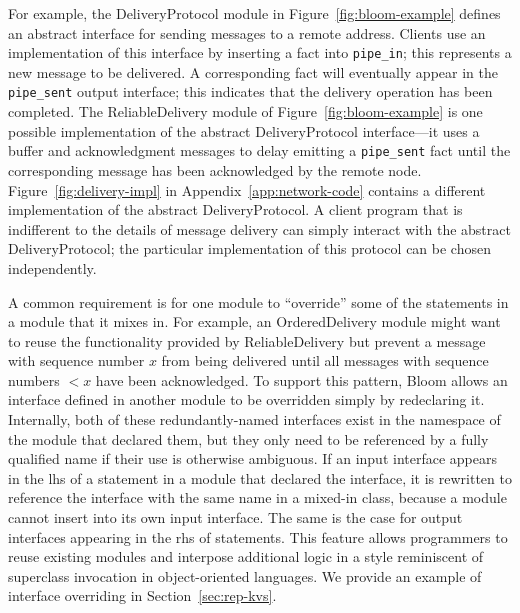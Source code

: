 For example, the DeliveryProtocol module in Figure~\ref{fig:bloom-example}
defines an abstract interface for sending messages to a remote address. Clients
use an implementation of this interface by inserting a fact into
\texttt{pipe\_in}; this represents a new message to be delivered. A
corresponding fact will eventually appear in the \texttt{pipe\_sent} output
interface; this indicates that the delivery operation has been completed. The
ReliableDelivery module of Figure~\ref{fig:bloom-example} is one possible implementation of the abstract
DeliveryProtocol interface---it uses a buffer and acknowledgment messages to
delay emitting a \texttt{pipe\_sent} fact until the corresponding message has
been acknowledged by the remote node. Figure~\ref{fig:delivery-impl} in
Appendix~\ref{app:network-code} contains a different implementation of the
abstract DeliveryProtocol. A client program that is indifferent to the details
of message delivery can simply interact with the abstract DeliveryProtocol; the
particular implementation of this protocol can be chosen independently.

A common requirement is for one module to ``override'' some of the statements in
a module that it mixes in. For example, an OrderedDelivery module might want to
reuse the functionality provided by ReliableDelivery but prevent a message with
sequence number $x$ from being delivered until all messages with sequence
numbers $<x$ have been acknowledged. To support this pattern, Bloom allows an
interface defined in another module to be overridden simply by redeclaring
it. Internally, both of these redundantly-named interfaces exist in the namespace
of the module that declared them, but they only need to be referenced by a
fully qualified name if their use is otherwise ambiguous.  If an input interface
appears in the lhs of a statement in a module that declared the interface, it is
rewritten to reference the interface with the same name in a mixed-in class,
because a module cannot insert into its own input interface. The same is the
case for output interfaces appearing in the rhs of statements.  This feature
allows programmers to reuse existing modules and interpose additional logic in a
style reminiscent of superclass invocation in object-oriented languages.  We
provide an example of interface overriding in Section~\ref{sec:rep-kvs}.


